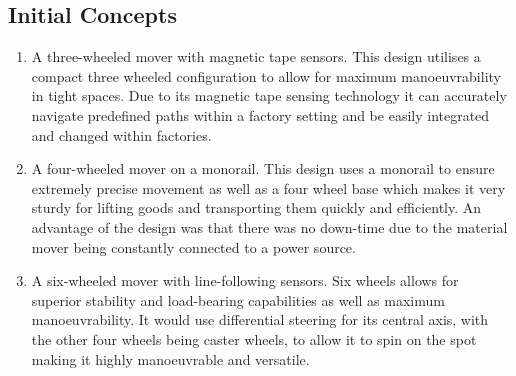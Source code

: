 \documentclass[12pt,titlepage]{article}
\begin{document}
\subsection{Initial Concepts}
 
\begin{enumerate}
     \item A three-wheeled mover with magnetic tape sensors. This design utilises a compact three wheeled configuration to allow for maximum manoeuvrability in tight spaces. Due to its magnetic tape sensing technology it can accurately navigate predefined paths within a factory setting and be easily integrated and changed within factories.
    \item A four-wheeled mover on a monorail. This design uses a monorail to ensure extremely precise movement as well as a four wheel base which makes it very sturdy for lifting goods and transporting them quickly and efficiently. An advantage of the design was that there was no down-time due to the material mover being constantly connected to a power source.
    \item A six-wheeled mover with line-following sensors. Six wheels allows for superior stability and load-bearing capabilities as well as maximum manoeuvrability. It would use differential steering for its central axis, with the other four wheels being caster wheels, to allow it to spin on the spot making it highly manoeuvrable and versatile.
 \end{enumerate}
\end{document}
